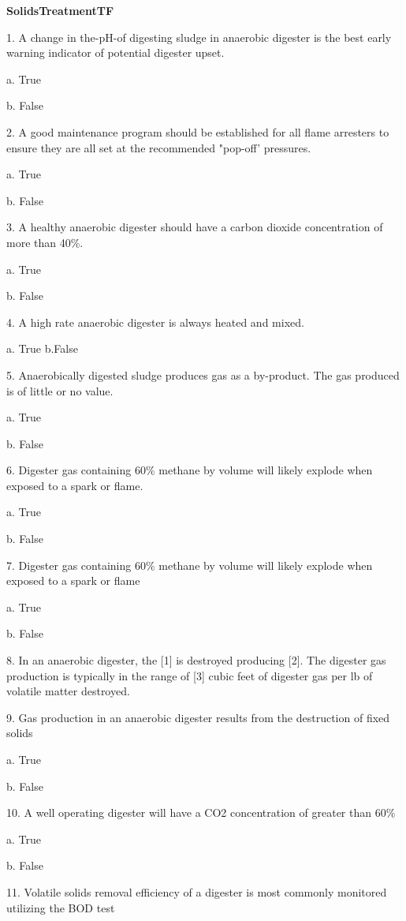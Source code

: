 \documentclass{article}
\begin{document}
\textbf{SolidsTreatmentTF}

1. A change in the-pH-of digesting sludge in anaerobic digester is the best early warning indicator of potential digester upset. 

a. True 

b. False 


2. A good maintenance program should be established for all flame arresters to ensure they are all set at the recommended "pop-off' pressures. 

a. True 

b. False 


3. A healthy anaerobic digester should have a carbon dioxide concentration of more than 40\%. 

a. True 

b. False 


4. A high rate anaerobic digester is always heated and mixed. 

a. True
b.False 


5. Anaerobically digested sludge produces gas as a by-product. The gas produced is of little or no value. 

a. True 

b. False 


6. Digester gas containing 60\% methane by volume will likely explode when exposed to a spark or flame. 

a. True 

b. False 


7. Digester gas containing 60\% methane by volume will likely explode when exposed to a spark or flame 

a. True 

b. False 


8. In an anaerobic digester, the [1] is destroyed producing [2]. The digester gas production is typically in the range of [3] cubic feet of digester gas per lb of volatile matter destroyed. 


9. Gas production in an anaerobic digester results from the destruction of fixed solids 

a. True 

b. False 


10. A well operating digester will have a CO2 concentration of greater than 60\% 

a. True 

b. False 


11. Volatile solids removal efficiency of a digester is most commonly monitored utilizing the BOD test
\end{document}
